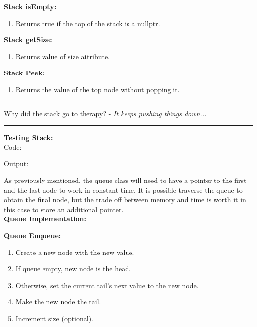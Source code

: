 \documentclass[letterpaper, 10pt]{article}
\begin{document}


\textbf{Stack isEmpty:}
\begin{enumerate}
    \item Returns true if the top of the stack is a nullptr.
\end{enumerate}
\textbf{Stack getSize:}
\begin{enumerate}
    \item Returns value of size attribute.
\end{enumerate}
\textbf{Stack Peek:}
\begin{enumerate}
    \item Returns the value of the top node without popping it.
\end{enumerate}
\hrule
\vspace{.25cm}
Why did the stack go to therapy? - \textit{It keeps pushing things down...}\\
\hrule
\vspace{.25cm}
\textbf{Testing Stack: } \\
Code:

Output:

\noindent
As previously mentioned, the queue class will need to have a pointer to the first and the last node to work in constant time. It is possible traverse the queue to obtain the final node, but the trade off between memory and time is worth it in this case to store an additional pointer. \\
\textbf{Queue Implementation:}


\newpage
\textbf{Queue Enqueue:}
\begin{enumerate}
    \item Create a new node with the new value.
    \item If queue empty, new node is the head.
    \item Otherwise, set the current tail's next value to the new node.
    \item Make the new node the tail.
    \item Increment size (optional).
\end{enumerate}


\end{document}
